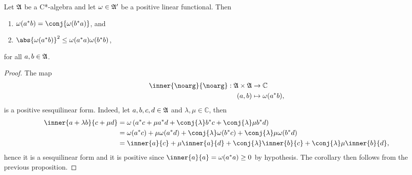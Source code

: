 \begin{corollary}
    Let \(\mathfrak{A}\) be a C*-algebra and let \(\omega \in \mathfrak{A}'\) be a positive linear functional. Then
    \begin{enumerate}[label=(\alph*)]
        \item \(\omega(a^*b) = \conj{\omega(b^*a)}\), and
        \item \(\abs{\omega(a^*b)}^2 \leq \omega(a^*a) \omega(b^*b)\),
    \end{enumerate}
    for all \(a, b \in \mathfrak{A}\).
\end{corollary}
\begin{proof}
    The map
    \begin{align*}
        \inner{\noarg}{\noarg} : \algebra{A} \times \algebra{A} &\to \mathbb{C}\\
                                                          (a,b) &\mapsto \omega(a^*b),
    \end{align*}
    is a positive sesquilinear form. Indeed, let \(a, b,c,d \in \mathfrak{A}\) and \(\lambda,\mu \in \mathbb{C}\), then
    \begin{align*}
        \inner{a + \lambda b}{c + \mu d} &= \omega\left(a^*c + \mu a^*d + \conj{\lambda} b^* c + \conj{\lambda}\mu b^*d\right)\\
                                         &= \omega(a^*c) + \mu \omega(a^*d) + \conj{\lambda} \omega(b^*c) + \conj{\lambda}\mu \omega(b^*d)\\
                                         &= \inner{a}{c} + \mu \inner{a}{d} + \conj{\lambda} \inner{b}{c} + \conj{\lambda}\mu \inner{b}{d},
    \end{align*}
    hence it is a sesquilinear form and it is positive since \(\inner{a}{a} = \omega(a^*a) \geq 0\) by hypothesis. The corollary then follows from the previous proposition.
\end{proof}

